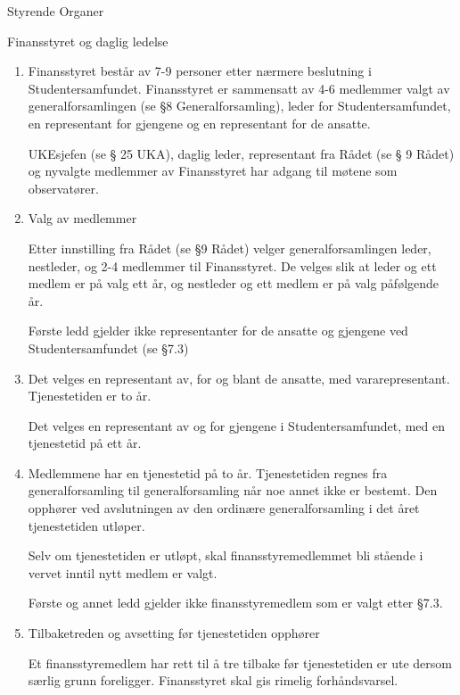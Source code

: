 \begin{lovkapittel}{Styrende Organer}
\begin{lovparagraf}{Finansstyret og daglig ledelse}

  \begin{enumerate}
  
    \item Finansstyret består av 7-9 personer etter nærmere beslutning i Studentersamfundet. Finansstyret er
    sammensatt av 4-6 medlemmer valgt av generalforsamlingen (se §8 Generalforsamling), leder for
    Studentersamfundet, en representant for gjengene og en representant for de ansatte.
    
    UKEsjefen (se § 25 UKA), daglig leder, representant fra Rådet (se § 9 Rådet) og nyvalgte medlemmer av
    Finansstyret har adgang til møtene som observatører.
    
    \item Valg av medlemmer
    
    Etter innstilling fra Rådet (se §9 Rådet) velger generalforsamlingen leder, nestleder, og 2-4 medlemmer til
    Finansstyret. De velges slik at leder og ett medlem er på valg ett år, og nestleder og ett medlem er på valg
    påfølgende år.
    
    Første ledd gjelder ikke representanter for de ansatte og gjengene ved Studentersamfundet (se §7.3)
    
    \item Det velges en representant av, for og blant de ansatte, med vararepresentant. Tjenestetiden er to år.
    
    Det velges en representant av og for gjengene i Studentersamfundet, med en tjenestetid på ett år.
    
    \item Medlemmene har en tjenestetid på to år. Tjenestetiden regnes fra generalforsamling til generalforsamling når
    noe annet ikke er bestemt. Den opphører ved avslutningen av den ordinære generalforsamling i det året
    tjenestetiden utløper.
    
    Selv om tjenestetiden er utløpt, skal finansstyremedlemmet bli stående i vervet inntil nytt medlem er valgt.
    
    Første og annet ledd gjelder ikke finansstyremedlem som er valgt etter §7.3.
    
    \item Tilbaketreden og avsetting før tjenestetiden opphører
    
    Et finansstyremedlem har rett til å tre tilbake før tjenestetiden er ute dersom særlig grunn foreligger. Finansstyret skal gis rimelig forhåndsvarsel.
    

\end{enumerate}
\end{lovparagraf}
\end{lovkapittel}
